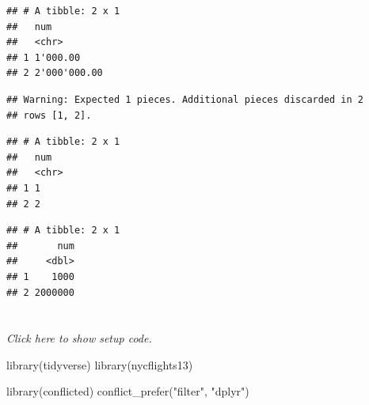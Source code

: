 \documentclass[]{book}
\newenvironment{Shaded}{}{}
\newcommand{\DataTypeTok}[1]{#1}
\newcommand{\KeywordTok}[1]{\textcolor[rgb]{0.00,0.00,1.00}{#1}}
\newcommand{\NormalTok}[1]{#1}
\newcommand{\OperatorTok}[1]{#1}
\newcommand{\StringTok}[1]{\textcolor[rgb]{0.00,0.50,0.50}{#1}}
\begin{document}
\begin{verbatim}
## # A tibble: 2 x 1
##   num         
##   <chr>       
## 1 1'000.00    
## 2 2'000'000.00
\end{verbatim}

\begin{Shaded}
\end{Shaded}

\begin{verbatim}
## Warning: Expected 1 pieces. Additional pieces discarded in 2
## rows [1, 2].
\end{verbatim}

\begin{verbatim}
## # A tibble: 2 x 1
##   num  
##   <chr>
## 1 1    
## 2 2
\end{verbatim}

\begin{Shaded}
\end{Shaded}

\begin{verbatim}
## # A tibble: 2 x 1
##       num
##     <dbl>
## 1    1000
## 2 2000000
\end{verbatim}

\hypertarget{section-1}{%
\section{}\label{section-1}}

\emph{Click here to show setup code.}

\begin{Shaded}
\begin{Highlighting}[]
\KeywordTok{library}\NormalTok{(tidyverse)}
\KeywordTok{library}\NormalTok{(nycflights13)}

\KeywordTok{library}\NormalTok{(conflicted)}
\KeywordTok{conflict_prefer}\NormalTok{(}\StringTok{"filter"}\NormalTok{, }\StringTok{"dplyr"}\NormalTok{)}
\end{Highlighting}
\end{Shaded}
\end{document}
